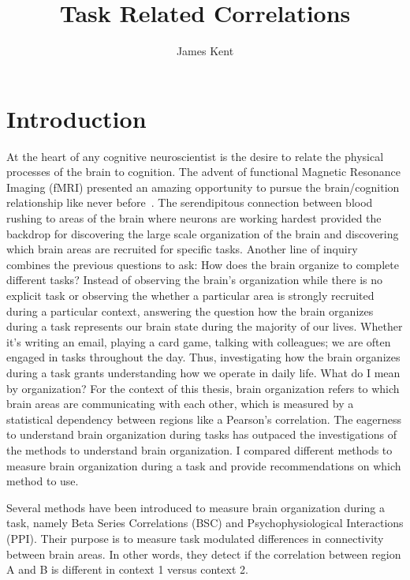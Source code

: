 \documentclass[phd,appendix,figures]{uithesis}
\title{Task Related Correlations}
\author{James Kent}
\begin{document}
\frontmatter
\chapter{Introduction}

At the heart of any cognitive neuroscientist is the desire to relate the physical
processes of the brain to cognition.
The advent of functional Magnetic Resonance Imaging (fMRI) presented an amazing opportunity
to pursue the brain/cognition relationship like never before~\cite{ogawa1990}.
The serendipitous connection between blood rushing to areas of the brain where neurons
are working hardest provided the backdrop for discovering the large scale organization
of the brain and discovering which brain areas are recruited for specific tasks.
Another line of inquiry combines the previous questions to ask: How does the brain
organize to complete different tasks?
Instead of observing the brain's organization while there is no explicit task or observing
the whether a particular area is strongly recruited during a particular context,
answering the question how the brain organizes during a task represents our brain state
during the majority of our lives.
Whether it's writing an email, playing a card game, talking with colleagues; we are
often engaged in tasks throughout the day.
Thus, investigating how the brain organizes during a task grants understanding how
we operate in daily life.
What do I mean by organization?
For the context of this thesis, brain organization refers to which brain areas are communicating
with each other, which is measured by a statistical dependency between
regions like a Pearson's correlation.
The eagerness to understand brain organization during tasks has outpaced the investigations
of the methods to understand brain organization.
I compared different methods to measure brain organization during a task
and provide recommendations on which method to use.

Several methods have been introduced to measure brain organization during a task,
namely Beta Series Correlations (BSC) and Psychophysiological Interactions (PPI).
Their purpose is to measure task modulated differences in connectivity between brain areas.
In other words, they detect if the correlation between region A and B is different
in context 1 versus context 2.
\end{document}
